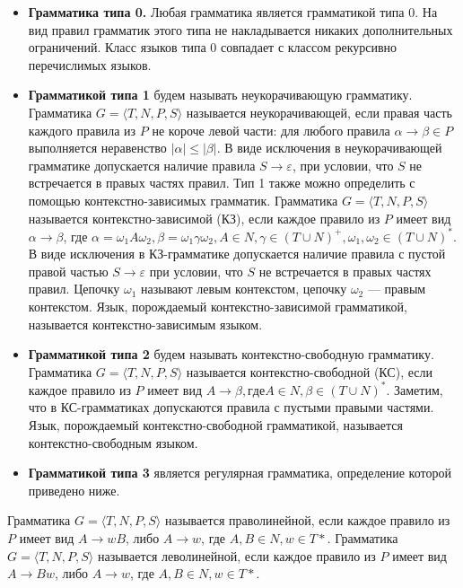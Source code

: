 \begin{itemize}
    \item \textbf{Грамматика типа 0.} Любая грамматика является грамматикой типа 0. На вид правил грамматик этого типа не накладывается никаких дополнительных ограничений. Класс языков типа 0 совпадает с классом рекурсивно перечислимых языков.
    
    \item \textbf{Грамматикой типа 1} будем называть неукорачивающую грамматику. Грамматика $G = \langle T, N, P, S \rangle$ называется неукорачивающей, если правая часть каждого правила из $P$ не короче левой части: для любого правила $\alpha \rightarrow \beta \in P$ выполняется неравенство $| \alpha | \leq | \beta |$. В виде исключения в неукорачивающей грамматике допускается наличие правила $S \rightarrow \varepsilon$, при условии, что $S$ не встречается в правых частях правил. Тип 1 также можно определить с помощью контекстно-зависимых грамматик. Грамматика $G = \langle T, N, P, S \rangle$ называется контекстно-зависимой (КЗ), если каждое правило из $P$ имеет вид $\alpha \rightarrow \beta$, где $\alpha = \omega_1 A\omega_2, \beta = \omega_1\gamma\omega_2, A \in N, \gamma \in (T \cup N )^+   , \omega_1, \omega_2 \in (T \cup N)^*$. В виде исключения в КЗ-грамматике допускается наличие правила с пустой правой частью $S \rightarrow \varepsilon$ при условии, что $S$ не встречается в правых частях правил. Цепочку $\omega_1$ называют левым контекстом, цепочку $\omega_2$ --- правым контекстом. Язык, порождаемый контекстно-зависимой грамматикой, называется контекстно-зависимым языком. 
    
    \item \textbf{Грамматикой типа 2} будем называть контекстно-свободную грамматику. Грамматика $G = \langle T, N, P, S \rangle$ называется контекстно-свободной (КС), если каждое правило из $P$ имеет вид $A \rightarrow \beta, где A \in N, \beta \in ( T \cup N )^*$. Заметим, что в КС-грамматиках допускаются правила с пустыми правыми частями.  Язык, порождаемый контекстно-свободной грамматикой, называется контекстно-свободным языком. 

    \item \textbf{Грамматикой типа 3} является регулярная грамматика, определение которой приведено ниже.
     
\end{itemize}

Грамматика $G = \langle T, N, P, S \rangle$ называется праволинейной, если каждое правило из $P$ имеет вид $A \rightarrow wB$, либо $A \rightarrow w$, где $A, B \in N, w \in T*$. Грамматика $G = \langle T, N, P, S \rangle$ называется леволинейной, если каждое правило из $P$ имеет вид $A \rightarrow Bw$, либо $A \rightarrow w$, где $A, B \in N, w \in T*$. 

